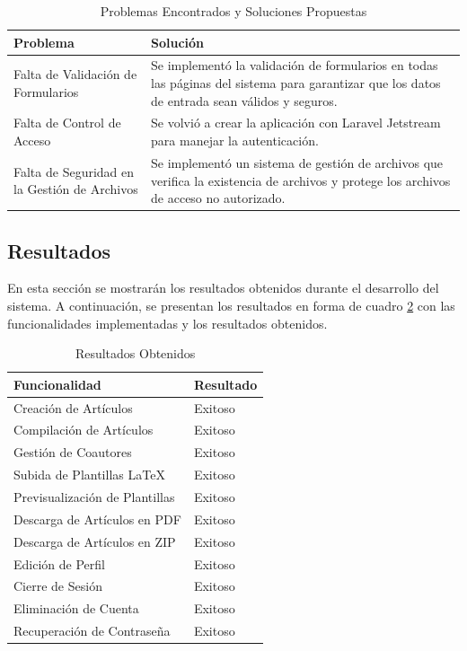 \begin{table}[H]
    \centering
    \begin{tabular}{|p{5cm}|p{10cm}|}
        \hline
        \textbf{Problema} & \textbf{Solución} \\
        \hline
        Falta de Validación de Formularios & Se implementó la validación de formularios en todas las páginas del sistema para garantizar que los datos de entrada sean válidos y seguros. \\
        Falta de Control de Acceso & Se volvió a crear la aplicación con Laravel Jetstream para manejar la autenticación. \\
        Falta de Seguridad en la Gestión de Archivos & Se implementó un sistema de gestión de archivos que verifica la existencia de archivos y protege los archivos de acceso no autorizado. \\
        \hline
    \end{tabular}
    \caption{Problemas Encontrados y Soluciones Propuestas}
    \label{tab:problemas-soluciones}
\end{table}

\subsection{Resultados}
En esta sección se mostrarán los resultados obtenidos durante el desarrollo del sistema. A continuación, se presentan los resultados en forma de cuadro \ref{tab:resultados} con las funcionalidades implementadas y los resultados obtenidos. 

\begin{table}[H]
    \centering
    \begin{tabular}{|p{10cm}|p{4cm}|}
        \hline
        \textbf{Funcionalidad} & \textbf{Resultado} \\
        \hline
        Creación de Artículos & Exitoso \\
        Compilación de Artículos & Exitoso \\
        Gestión de Coautores & Exitoso \\
        Subida de Plantillas LaTeX & Exitoso \\
        Previsualización de Plantillas & Exitoso \\
        Descarga de Artículos en PDF & Exitoso \\
        Descarga de Artículos en ZIP & Exitoso \\
        Edición de Perfil & Exitoso \\
        Cierre de Sesión & Exitoso \\
        Eliminación de Cuenta & Exitoso \\
        Recuperación de Contraseña & Exitoso \\
        \hline
    \end{tabular}
    \caption{Resultados Obtenidos}
    \label{tab:resultados}
\end{table}

